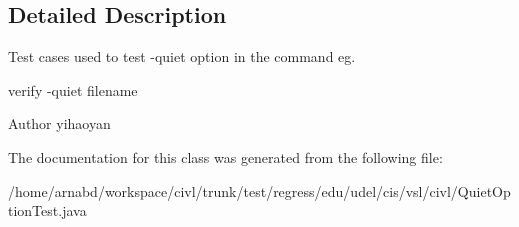 \subsection{Detailed Description}
Test cases used to test -\/quiet option in the command eg. 

verify -\/quiet filename

\begin{DoxyAuthor}{Author}
yihaoyan 
\end{DoxyAuthor}


The documentation for this class was generated from the following file\+:\begin{DoxyCompactItemize}
\item 
/home/arnabd/workspace/civl/trunk/test/regress/edu/udel/cis/vsl/civl/Quiet\+Option\+Test.\+java\end{DoxyCompactItemize}
